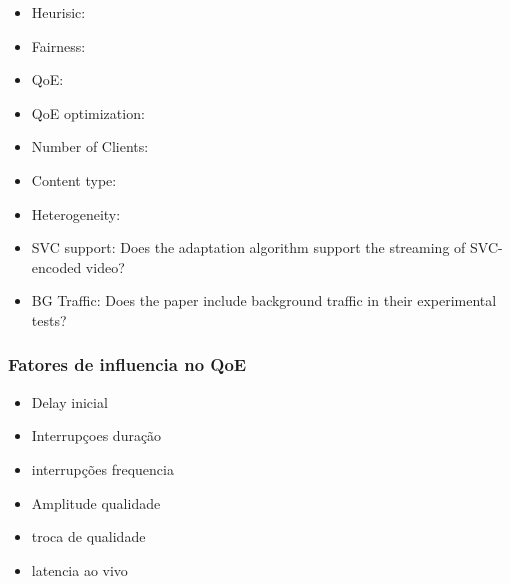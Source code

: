 \begin{itemize}

\item Heurisic:	

\item Fairness:

\item \ac{QoE}:

\item \ac{QoE} optimization:

\item Number of Clients:

\item Content type:

\item Heterogeneity:

\item SVC support: Does the adaptation algorithm support the streaming of SVC-encoded video?

\item BG Traffic: Does the paper include background traffic in their experimental tests?

\end{itemize}

\subsubsection{Fatores de influencia no QoE}

\begin{itemize}

\item Delay inicial

\item Interrupçoes duração

\item interrupções frequencia

\item Amplitude qualidade 

\item troca de qualidade

\item latencia ao vivo 

\end{itemize}
